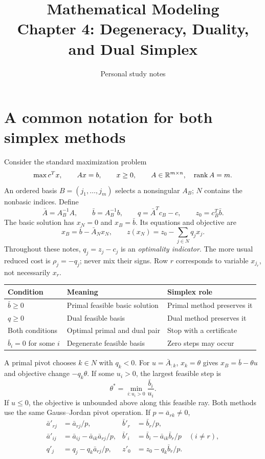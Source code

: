 \documentclass[11pt,a4paper]{article}
\title{\textbf{Mathematical Modeling}\\[2mm]
\large Chapter 4: Degeneracy, Duality, and Dual Simplex}
\author{Personal study notes}
\date{}
\begin{document}
\maketitle
\lecturelegend
{\small\tableofcontents}
\clearpage

\section{A common notation for both simplex methods}\label{sec:notation}
Consider the standard maximization problem
\[
  \max c^Tx,\qquad Ax=b,\qquad x\geq0,
  \qquad A\in\mathbb{R}^{m\times n},\quad \operatorname{rank}A=m.
\]
An ordered basis $B=(j_1,\ldots,j_m)$ selects a nonsingular $A_B$; $N$
contains the nonbasic indices. Define
\begin{equation}\label{eq:canonical}
  \bar A=A_B^{-1}A,\qquad \bar b=A_B^{-1}b,\qquad
  q=\bar A^Tc_B-c,\qquad z_0=c_B^T\bar b.
\end{equation}
The basic solution has $x_N=0$ and $x_B=\bar b$. Its equations and objective are
\begin{equation}\label{eq:dictionary}
  x_B=\bar b-\bar A_Nx_N,\qquad
  z(x_N)=z_0-\sum_{j\in N}q_jx_j.
\end{equation}
Throughout these notes, $q_j=z_j-c_j$ is an \emph{optimality indicator}.
The more usual reduced cost is $\rho_j=-q_j$; never mix their signs.
Row $r$ corresponds to variable $x_{j_r}$, not necessarily $x_r$.

\begin{center}
  \begin{tabular}{lll}\toprule
    Condition & Meaning & Simplex role\\\midrule
    $\bar b\geq0$ & Primal feasible basic solution & Primal method preserves it\\
    $q\geq0$ & Dual feasible basis & Dual method preserves it\\
    Both conditions & Optimal primal and dual pair & Stop with a certificate\\
    $\bar b_i=0$ for some $i$ & Degenerate feasible basis & Zero steps may occur\\\bottomrule
  \end{tabular}
\end{center}
A primal pivot chooses $k\in N$ with $q_k<0$. For $u=\bar A_{:k}$,
$x_k=\theta$ gives $x_B=\bar b-\theta u$ and objective change $-q_k\theta$.
If some $u_i>0$, the largest feasible step is
\[
  \theta^*=\min_{i:u_i>0}\frac{\bar b_i}{u_i}.
\]
If $u\leq0$, the objective is unbounded above along this feasible ray.
Both methods use the same Gauss--Jordan pivot operation. If $p=\bar a_{rk}\ne0$,
\begin{align*}
  \bar a'_{rj}&=\bar a_{rj}/p,& \bar b'_r&=\bar b_r/p,\\
  \bar a'_{ij}&=\bar a_{ij}-\bar a_{ik}\bar a_{rj}/p,
  &\bar b'_i&=\bar b_i-\bar a_{ik}\bar b_r/p\quad(i\ne r),\\
  q'_j&=q_j-q_k\bar a_{rj}/p,& z'_0&=z_0-q_k\bar b_r/p.
\end{align*}
\end{document}
